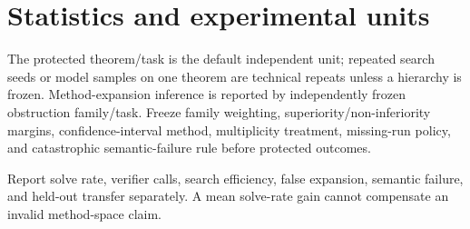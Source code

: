 \section{Statistics and experimental units}
The protected theorem/task is the default independent unit; repeated search seeds or model samples on one theorem are technical repeats unless a hierarchy is frozen. Method-expansion inference is reported by independently frozen obstruction family/task. Freeze family weighting, superiority/non-inferiority margins, confidence-interval method, multiplicity treatment, missing-run policy, and catastrophic semantic-failure rule before protected outcomes.

Report solve rate, verifier calls, search efficiency, false expansion, semantic failure, and held-out transfer separately. A mean solve-rate gain cannot compensate an invalid method-space claim.

